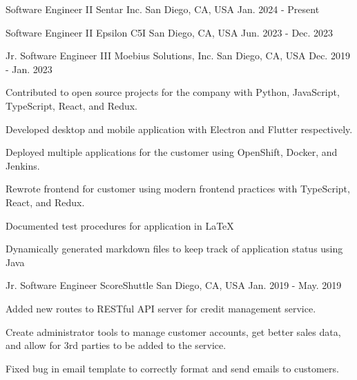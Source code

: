 

\begin{cventries}

	\cventry
	{Software Engineer II} %
	{Sentar Inc.} %
	{San Diego, CA, USA} %
	{Jan. 2024 - Present} %
	{}

	\cventry
	{Software Engineer II} %
	{Epsilon C5I} %
	{San Diego, CA, USA} %
	{Jun. 2023 - Dec. 2023} %
	{}

	\cventry
	{Jr. Software Engineer III} %
	{Moebius Solutions, Inc.} %
	{San Diego, CA, USA} %
	{Dec. 2019 - Jan. 2023} %
	{
		\begin{cvitems} %
			\item {Contributed to open source projects for the company with Python, JavaScript, TypeScript, React, and Redux.}
			\item {Developed desktop and mobile application with Electron and Flutter respectively.}
			\item {Deployed multiple applications for the customer using OpenShift, Docker, and Jenkins.}
			\item {Rewrote frontend for customer using modern frontend practices with TypeScript, React, and Redux.}
			\item {Documented test procedures for application in LaTeX}
			\item {Dynamically generated markdown files to keep track of application status using Java}
		\end{cvitems}
	}

	\cventry
	{Jr. Software Engineer} %
	{ScoreShuttle} %
	{San Diego, CA, USA} %
	{Jan. 2019 - May. 2019} %
	{
		\begin{cvitems} %
			\item {Added new routes to RESTful API server for credit management service.}
			\item {Create administrator tools to manage customer accounts, get better sales data, and allow for 3rd parties to be added to the service.}
			\item {Fixed bug in email template to correctly format and send emails to customers.}
		\end{cvitems}
	}

\end{cventries}
